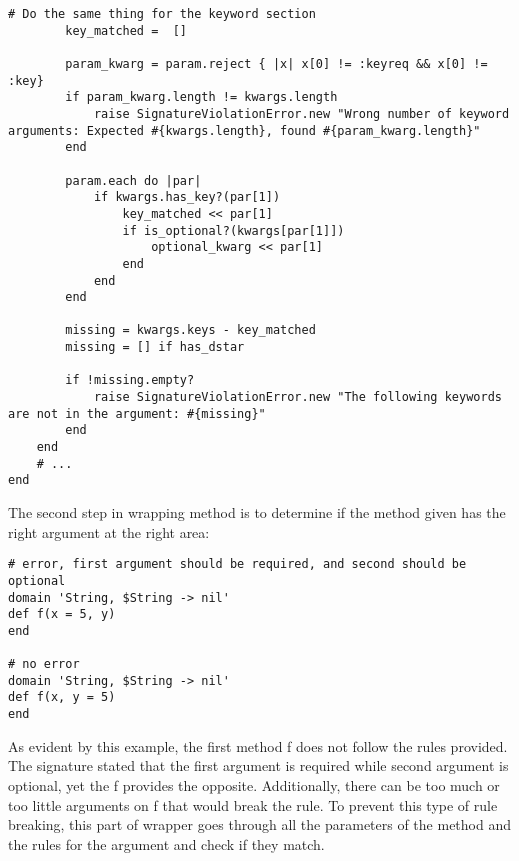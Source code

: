 \begin{lstlisting}[caption={Wrapper method: check if the method has correct argument(s)}]
        # Do the same thing for the keyword section
        key_matched =  []

        param_kwarg = param.reject { |x| x[0] != :keyreq && x[0] != :key}
        if param_kwarg.length != kwargs.length
            raise SignatureViolationError.new "Wrong number of keyword arguments: Expected #{kwargs.length}, found #{param_kwarg.length}"
        end
                
        param.each do |par|
            if kwargs.has_key?(par[1])
                key_matched << par[1]
                if is_optional?(kwargs[par[1]])
                    optional_kwarg << par[1]
                end
            end
        end

        missing = kwargs.keys - key_matched
        missing = [] if has_dstar

        if !missing.empty?
            raise SignatureViolationError.new "The following keywords are not in the argument: #{missing}"
        end
    end
    # ...
end
\end{lstlisting}

The second step in wrapping method is to determine if the method given has the right argument at the right area:

\begin{lstlisting}[caption={Example: wrapper method}]
# error, first argument should be required, and second should be optional
domain 'String, $String -> nil'
def f(x = 5, y)
end

# no error
domain 'String, $String -> nil'
def f(x, y = 5)
end
\end{lstlisting}

As evident by this example, the first method f does not follow the rules provided.  The signature stated that the first argument is required while second argument is optional, yet the f provides the opposite.  Additionally, there can be too much or too little arguments on f that would break the rule.  To prevent this type of rule breaking, this part of wrapper goes through all the parameters of the method and the rules for the argument and check if they match.

